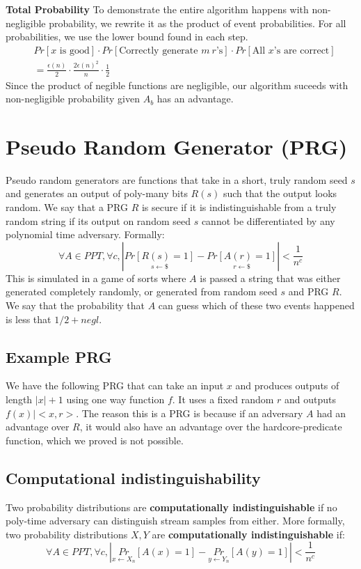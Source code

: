 \documentclass[11pt]{article}
\begin{document}
\textbf{Total Probability}
To demonstrate the entire algorithm happens with non-negligible probability, we rewrite it as the product of event probabilities. For all probabilities, we use the lower bound found in each step.
\begin{align*}
    &Pr[x \text{ is good}]\cdot Pr[\text{Correctly generate }m\ r\text{'s}] \cdot Pr[\text{All }x\text{'s are correct}]\\
    &= \frac{\epsilon(n)}{2} \cdot \frac{2\epsilon(n)^2}{n} \cdot \frac{1}{2}
\end{align*}
Since the product of negible functions are negligible, our algorithm suceeds with non-negligible probability given $A_b$ has an advantage.

\section{Pseudo Random Generator (PRG)}
Pseudo random generators are functions that take in a short, truly random seed $s$ and generates an output of poly-many bits $R(s)$ such that the output looks random. We say that a PRG $R$ is secure if it is indistinguishable from a truly random string if its output on random seed $s$ cannot be differentiated by any polynomial time adversary. Formally:
$$\forall A \in PPT, \forall c, |\underset{s \leftarrow \$}{Pr[R(s) = 1]} - \underset{r \leftarrow \$}{Pr[A(r) = 1]}| < \frac{1}{n^c}$$
This is simulated in a game of sorts where $A$ is passed a string that was either generated completely randomly, or generated from random seed $s$ and PRG $R$. We say that the probability that $A$ can guess which of these two events happened is less that $1/2 + negl$.
\subsection{Example PRG}
We have the following PRG that can take an input $x$ and produces outputs of length $|x| + 1$ using one way function $f$. It uses a fixed random $r$ and outputs $f(x) | <x,r>$. The reason this is a PRG is because if an adversary $A$ had an advantage over $R$, it would also have an advantage over the hardcore-predicate function, which we proved is not possible.

\subsection{Computational indistinguishability}
Two probability distributions are \textbf{computationally indistinguishable} if no poly-time adversary can distinguish stream samples from either. More formally, two probability distributions $X,Y$ are \textbf{computationally indistinguishable} if:
$$\forall A \in PPT, \forall c, |\underset{x\leftarrow X_n}{Pr}[A(x) = 1]-\underset{y\leftarrow Y_n}{Pr}[A(y) = 1]| < \frac{1}{n^c}$$
\end{document}
